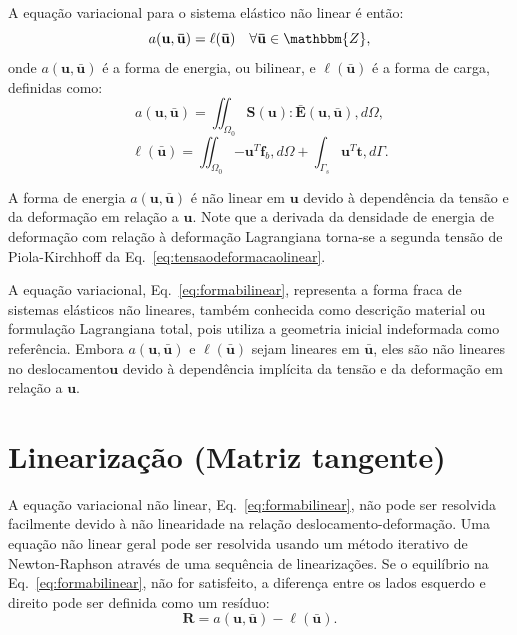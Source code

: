 A equação variacional para o sistema elástico não linear é então:
\begin{equation}\label{eq:formabilinear}
	a(\mathbf{u},\mathbf{\bar{u}}) = \ell(\mathbf{\bar{u}}) \quad \forall \mathbf{\bar{u}} \in \mathbbm{Z},
\end{equation}
onde $a(\mathbf{u},\mathbf{\bar{u}})$ é a forma de energia, ou bilinear, e $\ell(\mathbf{\bar{u}})$ é a forma de carga, definidas como:
\begin{equation}\label{eq:operadorBilinear}
	a(\mathbf{u},\mathbf{\bar{u}}) = \iint_{\Omega_0} \mathbf{S}(\mathbf{u}) : \mathbf{\bar{E}}(\mathbf{u},\mathbf{\bar{u}}) , d\Omega,
\end{equation}
\begin{equation}\label{eq:operadorForca}
	\ell(\mathbf{\bar{u}}) = \iint_{\Omega_0} \mathbf{-u}^T \mathbf{f}_b , d\Omega + \int_{\Gamma_s} \mathbf{u}^T \mathbf{t} , d\Gamma.
\end{equation}

A forma de energia $a(\mathbf{u},\mathbf{\bar{u}})$ é não linear em $\mathbf{u}$ devido à dependência da tensão e da deformação em relação a $\mathbf{u}$. Note que a derivada da densidade de energia de deformação com relação à deformação Lagrangiana torna-se a segunda tensão de Piola-Kirchhoff da Eq.~\eqref{eq:tensaodeformacaolinear}.


A equação variacional, Eq.~\eqref{eq:formabilinear}, representa a forma fraca de sistemas elásticos não lineares, também conhecida como descrição material ou formulação Lagrangiana total, pois utiliza a geometria inicial indeformada como referência. Embora $a(\mathbf{u},\mathbf{\bar{u}})$ e $\ell(\mathbf{\bar{u}})$ sejam lineares em $\mathbf{\bar{u}}$, eles são não lineares no deslocamento$\mathbf{u}$ devido à dependência implícita da tensão e da deformação em relação a $\mathbf{u}$.

\section{Linearização (Matriz tangente)}
A equação variacional não linear, Eq.~\eqref{eq:formabilinear}, não pode ser resolvida facilmente devido à não linearidade na relação deslocamento-deformação. Uma equação não linear geral pode ser resolvida usando um método iterativo de Newton-Raphson através de uma sequência de linearizações. Se o equilíbrio na Eq.~\eqref{eq:formabilinear}, não for satisfeito, a diferença entre os lados esquerdo e direito pode ser definida como um resíduo:
\begin{equation}\label{eq:residuo}
	\mathbf{R} = a(\mathbf{u},\mathbf{\bar{u}}) - \ell(\mathbf{\bar{u}}).
\end{equation}

